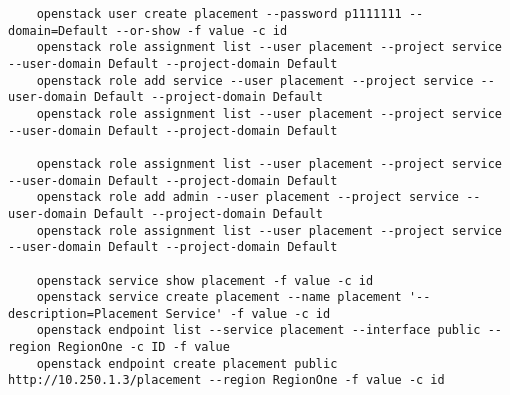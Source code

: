 \documentclass[a4paper,left=1.5cm,right=1.5cm,11pt]{article}
\begin{document}
\begin{lstlisting}
	openstack user create placement --password p1111111 --domain=Default --or-show -f value -c id
	openstack role assignment list --user placement --project service --user-domain Default --project-domain Default
	openstack role add service --user placement --project service --user-domain Default --project-domain Default
	openstack role assignment list --user placement --project service --user-domain Default --project-domain Default

	openstack role assignment list --user placement --project service --user-domain Default --project-domain Default
	openstack role add admin --user placement --project service --user-domain Default --project-domain Default
	openstack role assignment list --user placement --project service --user-domain Default --project-domain Default

	openstack service show placement -f value -c id
	openstack service create placement --name placement '--description=Placement Service' -f value -c id
	openstack endpoint list --service placement --interface public --region RegionOne -c ID -f value
	openstack endpoint create placement public http://10.250.1.3/placement --region RegionOne -f value -c id
	\end{lstlisting}
\end{document}
